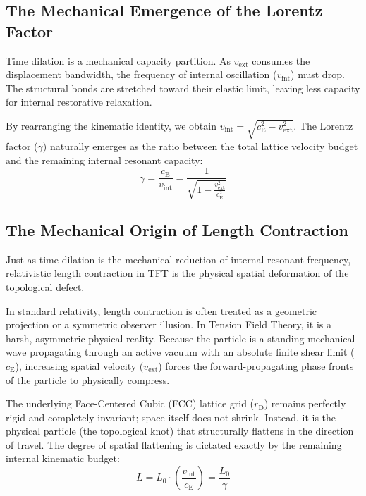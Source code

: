 \subsection{The Mechanical Emergence of the Lorentz Factor}
Time dilation is a mechanical capacity partition. As $v_{\mathrm{ext}}$ consumes the displacement bandwidth, the frequency of internal oscillation ($v_{\mathrm{int}}$) must drop. The structural bonds are stretched toward their elastic limit, leaving less capacity for internal restorative relaxation.

By rearranging the kinematic identity, we obtain $v_{\mathrm{int}} = \sqrt{c_{\mathrm{E}}^2 - v_{\mathrm{ext}}^2}$. The Lorentz factor ($\gamma$) naturally emerges as the ratio between the total lattice velocity budget and the remaining internal resonant capacity:
\begin{equation}
    \gamma = \frac{c_{\mathrm{E}}}{v_{\mathrm{int}}} = \frac{1}{\sqrt{1 - \frac{v_{\mathrm{ext}}^2}{c_{\mathrm{E}}^2}}}
\end{equation}

\subsection{The Mechanical Origin of Length Contraction}
Just as time dilation is the mechanical reduction of internal resonant frequency, relativistic length contraction in TFT is the physical spatial deformation of the topological defect.

In standard relativity, length contraction is often treated as a geometric projection or a symmetric observer illusion. In Tension Field Theory, it is a harsh, asymmetric physical reality. Because the particle is a standing mechanical wave propagating through an active vacuum with an absolute finite shear limit ($c_{\mathrm{E}}$), increasing spatial velocity ($v_{\mathrm{ext}}$) forces the forward-propagating phase fronts of the particle to physically compress.

The underlying Face-Centered Cubic (FCC) lattice grid ($r_{\mathrm{D}}$) remains perfectly rigid and completely invariant; space itself does not shrink. Instead, it is the physical particle (the topological knot) that structurally flattens in the direction of travel. The degree of spatial flattening is dictated exactly by the remaining internal kinematic budget:
\begin{equation}
    L = L_0 \cdot \left(\frac{v_{\mathrm{int}}}{c_{\mathrm{E}}}\right) = \frac{L_0}{\gamma}
\end{equation}

